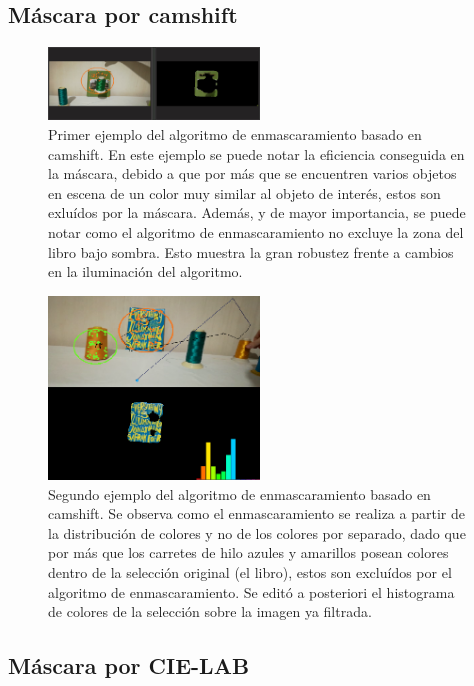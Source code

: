 \subsection{Máscara por camshift}
\begin{figure}
\centering
	\includegraphics[width=0.5\textwidth]{Imagenes/camshift_mask1.png}
	\caption{Primer ejemplo del algoritmo de enmascaramiento basado en camshift. En este ejemplo se puede notar la eficiencia conseguida en la máscara, debido a que por más que se encuentren varios objetos en escena de un color muy similar al objeto de interés, estos son exluídos por la máscara. Además, y de mayor importancia, se puede notar como el algoritmo de enmascaramiento no excluye la zona del libro bajo sombra. Esto muestra la gran robustez frente a cambios en la iluminación del algoritmo.}
	\label{fig:c_mask1}
\end{figure}
\begin{figure}[H]
\centering
	\includegraphics[width=0.5\textwidth]{Imagenes/camshift_mask2.png}
	\caption{Segundo ejemplo del algoritmo de enmascaramiento basado en camshift. Se observa como el enmascaramiento se realiza a partir de la distribución de colores y no de los colores por separado, dado que por más que los carretes de hilo azules y amarillos posean colores dentro de la selección original (el libro), estos son excluídos por el algoritmo de enmascaramiento. Se editó a posteriori el histograma de colores de la selección sobre la imagen ya filtrada.}
	\label{fig:c_mask2}
\end{figure}
\subsection{Máscara por CIE-LAB}



